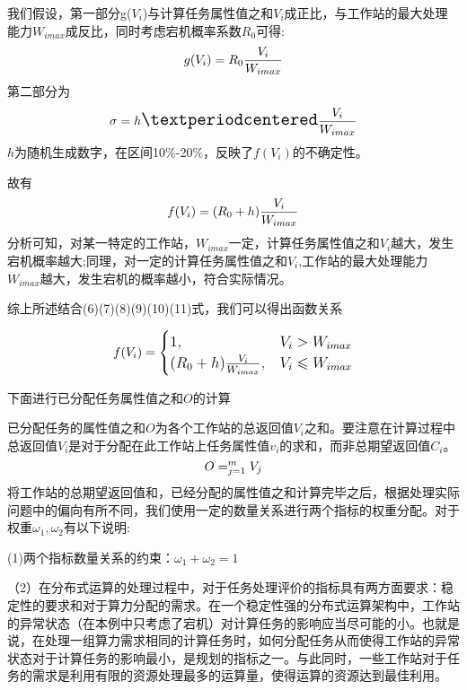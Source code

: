 \documentclass{MathorCupmodeling}
\begin{document}
我们假设，第一部分g($V_i$)与计算任务属性值之和$V_i$成正比，与工作站的最大处理能力$W_{imax}$成反比，同时考虑宕机概率系数$R_0$可得:
\begin{equation}
\Large g(V_i)= R_0\frac{V_i} {W_{imax}}\label{zz5}
\end{equation}
第二部分为
\begin{equation}
\Large\sigma=h·\frac{V_i}{W_{imax}}\label{zz6}
\end{equation}
$h$为随机生成数字，在区间10\%-20\%，反映了$f(V_i)$的不确定性。

故有
\begin{equation}
\Large f(V_i)=(R_0+h)\frac{V_i} {W_{imax}}\label{zz7}
\end{equation}
分析可知，对某一特定的工作站，$W_{imax}$一定，计算任务属性值之和$V_i$越大，发生宕机概率越大;同理，对一定的计算任务属性值之和$V_i$,工作站的最大处理能力$W_{imax}$越大，发生宕机的概率越小，符合实际情况。

综上所述结合(6)(7)(8)(9)(10)(11)式，我们可以得出函数关系

\begin{equation}\large
f(V_i) = \begin{cases}
1, & V_i>W_{imax} \\
 (R_0+h)\frac{V_i} {W_{imax}}, & V_i\leq W_{imax} \\
\end{cases}  \label{zz8}
\end{equation}

下面进行已分配任务属性值之和$O$的计算

已分配任务的属性值之和$O$为各个工作站的总返回值$V_i$之和。要注意在计算过程中总返回值$V_i$是对于分配在此工作站上任务属性值$v_i$的求和，而非总期望返回值$C_i$。
\begin{equation}
\large O=\sum_{j=1}^mV_j
\end{equation}
将工作站的总期望返回值和，已经分配的属性值之和计算完毕之后，根据处理实际问题中的偏向有所不同，我们使用一定的数量关系进行两个指标的权重分配。对于权重$\omega_1,\omega_2$有以下说明:

(1)两个指标数量关系的约束：$\omega_1+\omega_2=1$

（2）在分布式运算的处理过程中，对于任务处理评价的指标具有两方面要求：稳定性的要求和对于算力分配的需求。在一个稳定性强的分布式运算架构中，工作站的异常状态（在本例中只考虑了宕机）对计算任务的影响应当尽可能的小。也就是说，在处理一组算力需求相同的计算任务时，如何分配任务从而使得工作站的异常状态对于计算任务的影响最小，是规划的指标之一。与此同时，一些工作站对于任务的需求是利用有限的资源处理最多的运算量，使得运算的资源达到最佳利用。
\end{document}
